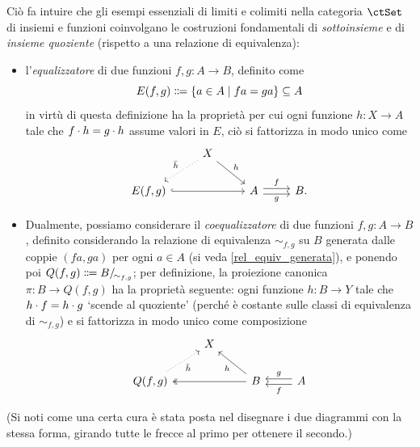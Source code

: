 Ciò fa intuire che gli esempi essenziali di limiti e colimiti nella categoria \(\ctSet\) di insiemi e funzioni coinvolgano le costruzioni fondamentali di \emph{sottoinsieme} e di \emph{insieme quoziente} (rispetto a una relazione di equivalenza):
\begin{itemize}
 \item l'\emph{equalizzatore} di due funzioni \(f,g \colon A \to B\), definito come
       \[E(f,g) \defeq  \{ a \in A \mid fa = ga\} \subseteq A\]
       in virtù di questa definizione ha la proprietà per cui ogni funzione \(h \colon X \to A\) tale che \(f\cdot h = g\cdot h\) assume valori in \(E\), ciò si fattorizza in modo unico come
       \[\begin{tikzcd}
         & X \\
         {E(f,g)} && A & B.
         \arrow["{\bar h}"', dotted, from=1-2, to=2-1]
         \arrow["h", from=1-2, to=2-3]
         \arrow[hook, from=2-1, to=2-3]
         \arrow["g"', shift right=1, from=2-3, to=2-4]
         \arrow["f", shift left=1, from=2-3, to=2-4]
        \end{tikzcd}\]
 \item Dualmente, possiamo considerare il \emph{coequalizzatore} di due funzioni \(f,g \colon A \to B\), definito considerando la relazione di equivalenza \(\sim_{f,g}\) su \(B\) generata dalle coppie \((fa,ga)\) per ogni \(a\in A\) (si veda \ref{rel_equiv_generata}), e ponendo poi \(Q(f,g) \defeq  B/_{\!\sim_{f,g}}\); per definizione, la proiezione canonica \(\pi \colon B \to Q(f,g)\) ha la proprietà seguente: ogni funzione \(h \colon B \to Y\) tale che \(h\cdot f = h\cdot g\) `scende al quoziente' (perché è costante sulle classi di equivalenza di \(\sim_{f,g}\)) e si fattorizza in modo unico come composizione
       \[\begin{tikzcd}
         & X \\
         {Q(f,g)} && B & A
         \arrow["{\bar h}"', dotted, to=1-2, from=2-1]
         \arrow["h", to=1-2, from=2-3]
         \arrow[two heads, to=2-1, from=2-3]
         \arrow["g"', shift right=1, to=2-3, from=2-4]
         \arrow["f", shift left=1, to=2-3, from=2-4]
        \end{tikzcd}\]
\end{itemize}
(Si noti come una certa cura è stata posta nel disegnare i due diagrammi con la stessa forma, girando tutte le frecce al primo per ottenere il secondo.)

